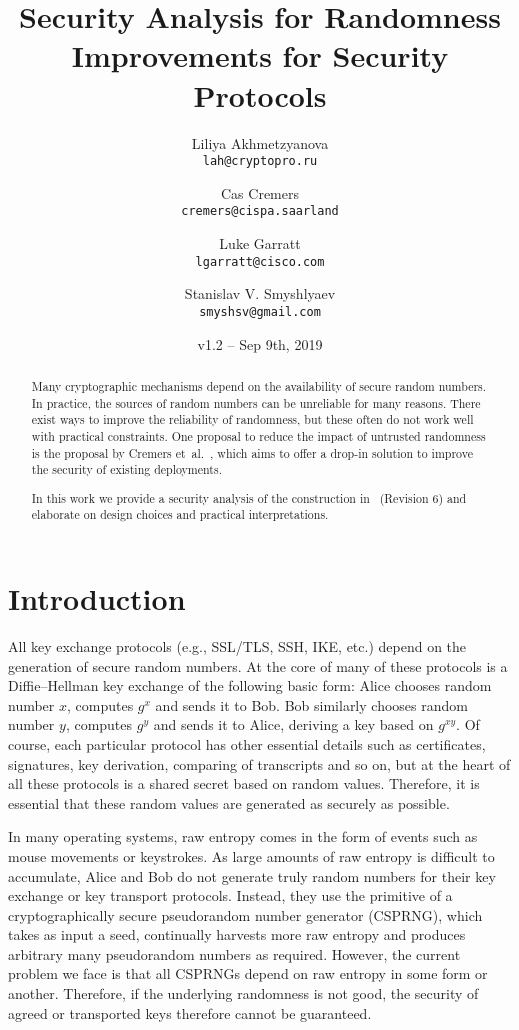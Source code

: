 \documentclass{article}
\author{
  Liliya Akhmetzyanova\\
  \texttt{lah@cryptopro.ru}
  \and
  Cas Cremers\\
  \texttt{cremers@cispa.saarland}
  \and
  Luke Garratt\\
  \texttt{lgarratt@cisco.com}
  \and
  Stanislav V. Smyshlyaev\\
  \texttt{smyshsv@gmail.com}
}
\title{Security Analysis for Randomness Improvements for Security
Protocols}
\date{v1.2 -- Sep 9th, 2019}
\begin{document}
  \maketitle


\begin{abstract}
Many cryptographic mechanisms depend on the availability of secure
	random numbers. In practice, the sources of random numbers can
	be unreliable for many reasons. There exist ways to improve the
	reliability of randomness, but these often do not work well with
	practical constraints.
	One proposal to reduce the impact of untrusted randomness is the
	proposal by Cremers et~al.~\cite{randomnessirtf}, which aims to
	offer a drop-in solution to improve the security of existing deployments. 

	In this work we provide a security analysis of the
	construction in~\cite{randomnessirtf} (Revision 6) and elaborate
	on design choices and practical interpretations.
\end{abstract}

\section{Introduction}
All key exchange protocols (e.g., SSL/TLS, SSH, IKE, etc.) depend on the generation of secure random numbers. At the core of many of these protocols is a Diffie--Hellman key exchange of the following basic form: Alice chooses random number $x$, computes $g^x$ and sends it to Bob. Bob similarly chooses random number $y$, computes $g^y$ and sends it to Alice, deriving a key based on $g^{xy}$. Of course, each particular protocol has other essential details such as certificates, signatures, key derivation, comparing of transcripts and so on, but at the heart of all these protocols is a shared secret based on random values. Therefore, it is essential that these random values are generated as securely as possible. 

In many operating systems, raw entropy comes in the form of events such as mouse movements or keystrokes. As large amounts of raw entropy is difficult to accumulate, Alice and Bob do not generate truly random numbers for their key exchange or key transport protocols. Instead, they use the primitive of a cryptographically secure pseudorandom number generator (CSPRNG), which takes as input a seed, continually harvests more raw entropy and  produces arbitrary many pseudorandom numbers as required. 
However, the current problem we face is that all CSPRNGs depend on raw entropy in some form or another. Therefore, if the underlying randomness is not good, the security of agreed or transported keys therefore cannot be guaranteed.
\end{document}
